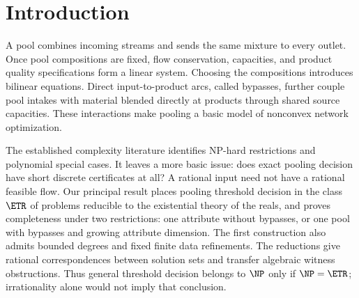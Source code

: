 \begin{abstract}
Pooling couples network flows by requiring every outlet of a pool to
carry the same mixture. We prove that rational pooling threshold
decision is complete for the existential theory of the reals, both
with one attribute and no bypasses and with one pool and a growing
attribute dimension. The no-bypass, many-pool reduction also has bounded
local degrees and fixed finite data. Both reductions imply that feasible
flows can require unbounded algebraic degree. With a fixed number of
mixing parameters, basis indices instead
give polynomial-size certificates verified by real-algebraic decision.
We then establish matched hardness and tractability boundaries. Strong
NP-completeness persists with all four layer degrees equal to two when the
pool count grows. With one pool, two feeds and two outlets, degree-three
products permit strong hardness with fixed finite physical data, whereas
degree-two products admit polynomial feasibility when input out-degree
is at most two; the degree-three contracted version is also strongly
NP-complete for feasibility. Exact algorithms follow from independent bounded blocks,
small path boundaries, or conservation under exact contracts. These
algorithms specify their objective scope and algebraic output. Physical
families show that exponentially many price regimes or isolated optima
can coexist with polynomial exact optimization. For isolated rank-one margin blocks, we resolve
the general-cost hardness conjecture, prove fixed-interaction-rank
tractability, and establish exact and uniform approximate conic size
lower bounds.
\end{abstract}

\section*{Introduction}
A pool combines incoming streams and sends the same mixture to every
outlet. Once pool compositions are fixed, flow conservation, capacities,
and product quality specifications form a linear system. Choosing the
compositions introduces bilinear equations. Direct input-to-product
arcs, called bypasses, further couple pool intakes with material blended
directly at products through shared source capacities. These interactions
make pooling a basic model of nonconvex network optimization.

The established complexity literature identifies NP-hard restrictions
and polynomial special cases. It leaves a more basic issue: does exact
pooling decision have short discrete certificates at all? A rational
input need not have a rational feasible flow. Our principal result places
pooling threshold decision in the class $\ETR$ of problems reducible to
the existential theory of the reals, and proves completeness under two
restrictions: one attribute without bypasses, or one pool with bypasses
and growing attribute dimension. The first construction also admits
bounded degrees and fixed finite data refinements. The reductions give
rational correspondences between solution sets and transfer algebraic
witness obstructions. Thus general threshold decision belongs to $\NP$
only if $\NP=\ETR$; irrationality alone would not imply that conclusion.

